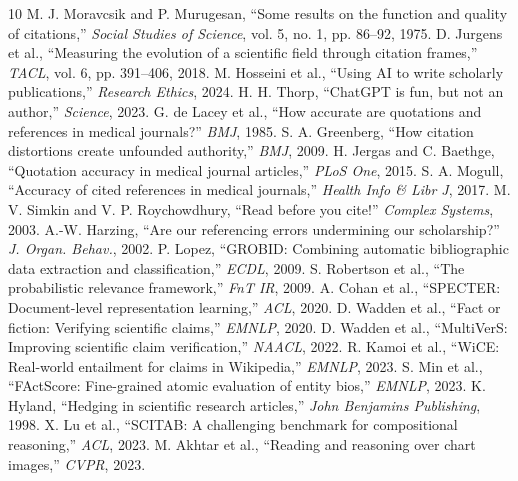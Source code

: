 \documentclass[sigconf]{acmart}
\begin{document}
\begin{thebibliography}{10}
 M. J. Moravcsik and P. Murugesan, ``Some results on the function and quality of citations,'' \emph{Social Studies of Science}, vol. 5, no. 1, pp. 86--92, 1975.
 D. Jurgens et al., ``Measuring the evolution of a scientific field through citation frames,'' \emph{TACL}, vol. 6, pp. 391--406, 2018.
 M. Hosseini et al., ``Using AI to write scholarly publications,'' \emph{Research Ethics}, 2024.
 H. H. Thorp, ``ChatGPT is fun, but not an author,'' \emph{Science}, 2023.
 G. de Lacey et al., ``How accurate are quotations and references in medical journals?'' \emph{BMJ}, 1985.
 S. A. Greenberg, ``How citation distortions create unfounded authority,'' \emph{BMJ}, 2009.
 H. Jergas and C. Baethge, ``Quotation accuracy in medical journal articles,'' \emph{PLoS One}, 2015.
 S. A. Mogull, ``Accuracy of cited references in medical journals,'' \emph{Health Info \& Libr J}, 2017.
 M. V. Simkin and V. P. Roychowdhury, ``Read before you cite!'' \emph{Complex Systems}, 2003.
 A.-W. Harzing, ``Are our referencing errors undermining our scholarship?'' \emph{J. Organ. Behav.}, 2002.
 P. Lopez, ``GROBID: Combining automatic bibliographic data extraction and classification,'' \emph{ECDL}, 2009.
 S. Robertson et al., ``The probabilistic relevance framework,'' \emph{FnT IR}, 2009.
 A. Cohan et al., ``SPECTER: Document-level representation learning,'' \emph{ACL}, 2020.
 D. Wadden et al., ``Fact or fiction: Verifying scientific claims,'' \emph{EMNLP}, 2020.
 D. Wadden et al., ``MultiVerS: Improving scientific claim verification,'' \emph{NAACL}, 2022.
 R. Kamoi et al., ``WiCE: Real-world entailment for claims in Wikipedia,'' \emph{EMNLP}, 2023.
 S. Min et al., ``FActScore: Fine-grained atomic evaluation of entity bios,'' \emph{EMNLP}, 2023.
 K. Hyland, ``Hedging in scientific research articles,'' \emph{John Benjamins Publishing}, 1998.
 X. Lu et al., ``SCITAB: A challenging benchmark for compositional reasoning,'' \emph{ACL}, 2023.
 M. Akhtar et al., ``Reading and reasoning over chart images,'' \emph{CVPR}, 2023.

\end{thebibliography}
\end{document}
